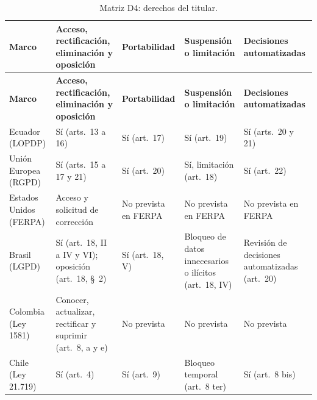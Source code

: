 {\scriptsize
\renewcommand{\arraystretch}{1.12}
\begin{xltabular}{\textwidth}{|>{\raggedright\arraybackslash}p{2.0cm}|L|L|L|L|}
  \caption{Matriz D4: derechos del titular.}
  \label{tab:matriz_d4} \\
  \hline
  \textbf{Marco} & \textbf{Acceso, rectificación, eliminación y oposición} & \textbf{Portabilidad} & \textbf{Suspensión o limitación} & \textbf{Decisiones automatizadas} \\
  \hline
  \endfirsthead
  \hline
  \textbf{Marco} & \textbf{Acceso, rectificación, eliminación y oposición} & \textbf{Portabilidad} & \textbf{Suspensión o limitación} & \textbf{Decisiones automatizadas} \\
  \hline
  \endhead
  \hline
  \endlastfoot
  Ecuador (LOPDP) & Sí (arts.~13 a 16) & Sí (art.~17) & Sí (art.~19) & Sí (arts.~20 y 21) \\ \hline
  Unión Europea (RGPD) & Sí (arts.~15 a 17 y 21) \cite{rgpd2016} & Sí (art.~20) & Sí, limitación (art.~18) & Sí (art.~22) \\ \hline
  Estados Unidos (FERPA) & Acceso y solicitud de corrección \cite{ferpa34cfr} & No prevista en FERPA & No prevista en FERPA & No prevista en FERPA \\ \hline
  Brasil (LGPD) & Sí (art.~18, II a IV y VI); oposición (art.~18, §~2) & Sí (art.~18, V) & Bloqueo de datos innecesarios o ilícitos (art.~18, IV) & Revisión de decisiones automatizadas (art.~20) \\ \hline
  Colombia (Ley 1581) & Conocer, actualizar, rectificar y suprimir (art.~8, a y e) & No prevista & No prevista & No prevista \\ \hline
  Chile (Ley 21.719) & Sí (art.~4) & Sí (art.~9) & Bloqueo temporal (art.~8 ter) & Sí (art.~8 bis) \\ \hline
\end{xltabular}
}

